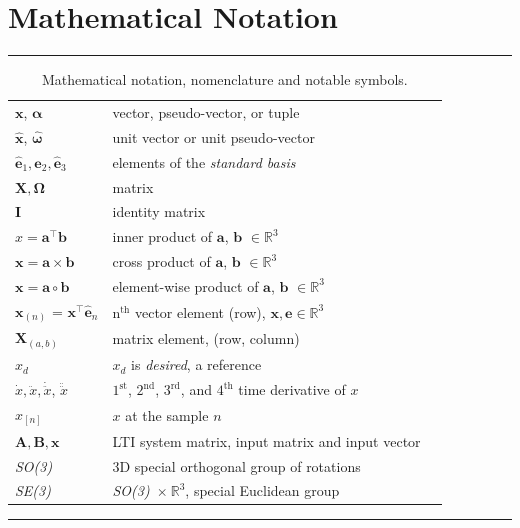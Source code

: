 \newpage
\section{Mathematical Notation}

\begin{table}[!h]
  \scriptsize
  \centering
  \noindent\rule{\textwidth}{0.5pt}
  \begin{tabular}{lll}
    $\mathbf{x}$, $\bm{\alpha}$ & vector, pseudo-vector, or tuple\\
    $\mathbf{\hat{x}}$, $\bm{\hat{\omega}}$& unit vector or unit pseudo-vector\\
    $\mathbf{\hat{e}}_1, \mathbf{\hat{e}}_2, \mathbf{\hat{e}}_3$ & elements of the \emph{standard basis} \\
    $\mathbf{X}, \bm{\Omega}$ & matrix \\
    $\mathbf{I}$ & identity matrix \\
    $x = \mathbf{a}^\intercal\mathbf{b}$ & inner product of $\mathbf{a}$, $\mathbf{b}$ $\in \mathbb{R}^3$\\
    $\mathbf{x} = \mathbf{a}\times\mathbf{b}$ & cross product of $\mathbf{a}$, $\mathbf{b}$ $\in \mathbb{R}^3$\\
    $\mathbf{x} = \mathbf{a}\circ\mathbf{b}$ & element-wise product of $\mathbf{a}$, $\mathbf{b}$ $\in \mathbb{R}^3$ \\
    $\mathbf{x}_{(n)}$ = $\mathbf{x}^\intercal\mathbf{\hat{e}}_n$ & $\mathrm{n}^{\mathrm{th}}$ vector element (row), $\mathbf{x}, \mathbf{e} \in \mathbb{R}^3$\\
    $\mathbf{X}_{(a,b)}$ & matrix element, (row, column)\\
    $x_{d}$ & $x_d$ is \emph{desired}, a reference\\
    $\dot{x}, \ddot{x}, \dot{\ddot{x}}$, $\ddot{\ddot{x}}$ & ${1^{\mathrm{st}}}$, ${2^{\mathrm{nd}}}$, ${3^{\mathrm{rd}}}$, and ${4^{\mathrm{th}}}$ time derivative of $x$\\
    $x_{[n]}$ & $x$ at the sample $n$ \\
    $\mathbf{A}, \mathbf{B}, \mathbf{x}$ & LTI system matrix, input matrix and input vector\\
    \emph{SO(3)} & 3D special orthogonal group of rotations\\
    \emph{SE(3)} & \emph{SO(3)}~$\times~\mathbb{R}^3$, special Euclidean group\\
  \end{tabular}
  \noindent\rule{\textwidth}{0.5pt}
  \caption{Mathematical notation, nomenclature and notable symbols.}
  \label{tab:mathematical_notation}
\end{table}
